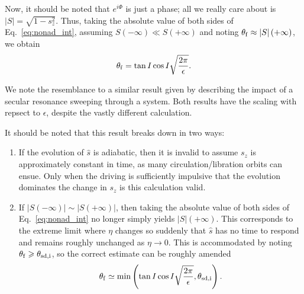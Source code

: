 \documentclass[
        fleqn,
        usenatbib,
        referee,
    ]{mnras}
\newcommand*{\abs}[1]{\left|#1\right|}
\newcommand*{\p}[1]{\left(#1\right)}
\begin{document}
Now, it should be noted that $e^{i\Phi}$ is just a phase; all we really care
about is $\abs{S} = \sqrt{1 - s_z^2}$. Thus, taking the absolute value of both
sides of Eq.~\eqref{eq:nonad_int}, assuming $S\p{-\infty} \ll S\p{+\infty}$ and
noting $\theta_{\rm f} \approx \abs{S}(+\infty)$, we obtain
\begin{equation}
    \theta_{\rm f} = \tan I\cos I\sqrt{\frac{2\pi}{\epsilon}}.
        \label{eq:nonad_dong}
\end{equation}

We note the resemblance to a similar result given by \citet{malhotra_calc}
describing the impact of a secular resonance sweeping through a system. Both
results have the scaling with repsect to $\epsilon$, despite the vastly
different calculation.

It should be noted that this result breaks down in two ways:
\begin{enumerate}
    \item If the evolution of $\hat{s}$ is adiabatic, then it is invalid to
        assume $s_z$ is approximately constant in time, as many
        circulation/libration orbits can ensue. Only when the driving is
        sufficiently impulsive that the evolution dominates the change in $s_z$
        is this calculation valid.

    \item If $\abs{S\p{-\infty}} \sim \abs{S\p{+\infty}}$, then taking the
        absolute value of both sides of Eq.~\eqref{eq:nonad_int} no longer
        simply yields $\abs{S}\p{+\infty}$. This corresponds to the extreme
        limit where $\eta$ changes so suddenly that $\hat{s}$ has no time to
        respond and remains roughly unchanged as $\eta \to 0$. This is
        accommodated by noting $\theta_{\rm f} \geq \theta_{\rm sd, i}$, so the
        correct estimate can be roughly amended
        \begin{equation}
            \theta_{\rm f} \simeq \min\p{\tan I\cos
                I\sqrt{\frac{2\pi}{\epsilon}}, \theta_{\rm sd, i}}.
        \end{equation}
\end{enumerate}

\bsp
\label{lastpage} %
\end{document}
